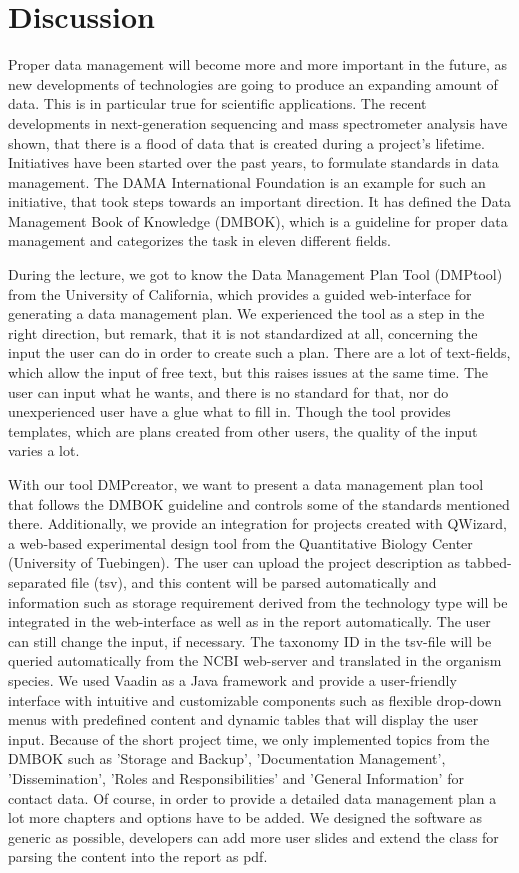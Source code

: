 \section{Discussion}
Proper data management will become more and more important in the future, as new developments of technologies are going to produce an expanding amount of data. This is in particular true for scientific applications. The recent developments in next-generation sequencing and mass spectrometer analysis have shown, that there is a flood of data that is created during a project's lifetime.
Initiatives have been started over the past years, to formulate standards in data management. The DAMA International Foundation is an example for such an initiative, that took steps towards an important direction. It has defined the Data Management Book of Knowledge (DMBOK), which is a guideline for proper data management and categorizes the task in eleven different fields. 

During the lecture, we got to know the Data Management Plan Tool (DMPtool) from the University of California, which provides a guided web-interface for generating a data management plan. We experienced the tool as a step in the right direction, but remark, that it is not standardized at all, concerning the input the user can do in order to create such a plan. There are a lot of text-fields, which allow the input of free text, but this raises issues at the same time. The user can input what he wants, and there is no standard for that, nor do unexperienced user have a glue what to fill in. Though the tool provides templates, which are plans created from other users, the quality of the input varies a lot.

With our tool DMPcreator, we want to present a data management plan tool that follows the DMBOK guideline and controls some of the standards mentioned there. Additionally, we provide an integration for projects created with QWizard, a web-based experimental design tool from the Quantitative Biology Center (University of Tuebingen). The user can upload the project description as tabbed-separated file (tsv), and this content will be parsed automatically and information such as storage requirement derived from the technology type will be integrated in the web-interface as well as in the report automatically. The user can still change the input, if necessary.
The taxonomy ID in the tsv-file will be queried automatically from the NCBI web-server and translated in the organism species.
We used Vaadin as a Java framework and provide a user-friendly interface with intuitive and customizable components such as flexible drop-down menus with predefined content and dynamic tables that will display the user input. Because of the short project time, we only implemented topics from the DMBOK such as 'Storage and Backup', 'Documentation Management', 'Dissemination', 'Roles and Responsibilities' and 'General Information' for contact data. Of course, in order to provide a detailed data management plan a lot more chapters and options have to be added. We designed the software as generic as possible, developers can add more user slides and extend the class for parsing the content into the report as pdf.

